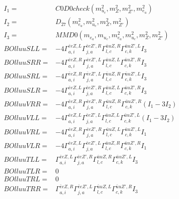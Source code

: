 \documentclass[A4,landscape]{article}
\begin{document}
\begin{align} 
I_1 = & C0D0check(m^2_{u_{{c}}}, m^2_{Z}, m^2_{{Z'}}, m^2_{e_{{a}}}) \\ 
I_2 = & D_{27}(m^2_{e_{{a}}}, m^2_{u_{{c}}}, m^2_{Z}, m^2_{{Z'}}) \\ 
I_3 = & MMD0(m_{e_{{a}}}, m_{u_{{c}}}, m^2_{e_{{a}}}, m^2_{u_{{c}}}, m^2_{Z}, m^2_{{Z'}}) \\ 
  BOlluuSLL= & -4  \Gamma^{\bar{e}e Z ,L}_{a, i} \Gamma^{\bar{e}e {Z'} ,R}_{j, a} \Gamma^{\bar{u}u Z ,R}_{l, c} \Gamma^{\bar{u}u {Z'} ,L}_{c, k} I_3 \\ 
  BOlluuSRR= & -4  \Gamma^{\bar{e}e Z ,R}_{a, i} \Gamma^{\bar{e}e {Z'} ,L}_{j, a} \Gamma^{\bar{u}u Z ,L}_{l, c} \Gamma^{\bar{u}u {Z'} ,R}_{c, k} I_3 \\ 
  BOlluuSRL= & -4  \Gamma^{\bar{e}e Z ,R}_{a, i} \Gamma^{\bar{e}e {Z'} ,L}_{j, a} \Gamma^{\bar{u}u Z ,R}_{l, c} \Gamma^{\bar{u}u {Z'} ,L}_{c, k} I_3 \\ 
  BOlluuSLR= & -4  \Gamma^{\bar{e}e Z ,L}_{a, i} \Gamma^{\bar{e}e {Z'} ,R}_{j, a} \Gamma^{\bar{u}u Z ,L}_{l, c} \Gamma^{\bar{u}u {Z'} ,R}_{c, k} I_3 \\ 
  BOlluuVRR= & -4  \Gamma^{\bar{e}e Z ,R}_{a, i} \Gamma^{\bar{e}e {Z'} ,R}_{j, a} \Gamma^{\bar{u}u Z ,R}_{l, c} \Gamma^{\bar{u}u {Z'} ,R}_{c, k} (I_1 - 3 I_2) \\ 
  BOlluuVLL= & -4  \Gamma^{\bar{e}e Z ,L}_{a, i} \Gamma^{\bar{e}e {Z'} ,L}_{j, a} \Gamma^{\bar{u}u Z ,L}_{l, c} \Gamma^{\bar{u}u {Z'} ,L}_{c, k} (I_1 - 3 I_2) \\ 
  BOlluuVRL= & -4  \Gamma^{\bar{e}e Z ,R}_{a, i} \Gamma^{\bar{e}e {Z'} ,R}_{j, a} \Gamma^{\bar{u}u Z ,L}_{l, c} \Gamma^{\bar{u}u {Z'} ,L}_{c, k} I_1 \\ 
  BOlluuVLR= & -4  \Gamma^{\bar{e}e Z ,L}_{a, i} \Gamma^{\bar{e}e {Z'} ,L}_{j, a} \Gamma^{\bar{u}u Z ,R}_{l, c} \Gamma^{\bar{u}u {Z'} ,R}_{c, k} I_1 \\ 
  BOlluuTLL= &  \Gamma^{\bar{e}e Z ,L}_{a, i} \Gamma^{\bar{e}e {Z'} ,R}_{j, a} \Gamma^{\bar{u}u Z ,R}_{l, c} \Gamma^{\bar{u}u {Z'} ,L}_{c, k} I_3 \\ 
  BOlluuTLR= & 0 \\ 
  BOlluuTRL= & 0 \\ 
  BOlluuTRR= &  \Gamma^{\bar{e}e Z ,R}_{a, i} \Gamma^{\bar{e}e {Z'} ,L}_{j, a} \Gamma^{\bar{u}u Z ,L}_{l, c} \Gamma^{\bar{u}u {Z'} ,R}_{c, k} I_3 \\ 
\end{align} 
\end{document}
